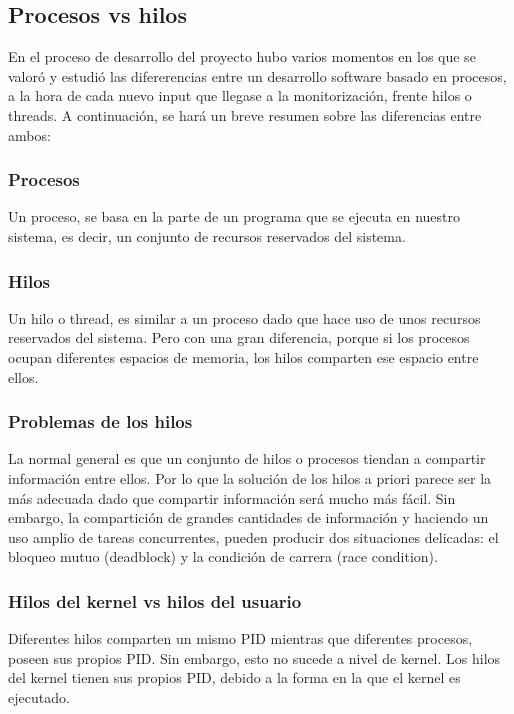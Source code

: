 \subsection{Procesos vs hilos}

En el proceso de desarrollo del proyecto hubo varios momentos en los que se valoró y estudió las difererencias entre un desarrollo software basado en procesos, a la hora de cada nuevo input que llegase a la monitorización, frente hilos o threads. A continuación, se hará un breve resumen sobre las diferencias entre ambos:

\subsubsection{Procesos}

Un proceso, se basa en la parte de un programa que se ejecuta en nuestro sistema, es decir, un conjunto de recursos reservados del sistema.

\subsubsection{Hilos}

Un hilo o thread, es similar a un proceso dado que hace uso de unos recursos reservados del sistema. Pero con una gran diferencia, porque si los procesos ocupan diferentes espacios de memoria, los hilos comparten ese espacio entre ellos.

\subsubsection{Problemas de los hilos}

La normal general es que un conjunto de hilos o procesos tiendan a compartir información entre ellos. Por lo que la solución de los hilos a priori parece ser la más adecuada dado que compartir información será mucho más fácil. Sin embargo, la compartición de grandes cantidades de información y haciendo un uso amplio de tareas concurrentes, pueden producir dos situaciones delicadas: el bloqueo mutuo (deadblock) y la condición de carrera (race condition).\\

\subsubsection{Hilos del kernel vs hilos del usuario}

Diferentes hilos comparten un mismo PID mientras que diferentes procesos, poseen sus propios PID. Sin embargo, esto no sucede a nivel de kernel. Los hilos del kernel tienen sus propios PID, debido a la forma en la que el kernel es ejecutado.\\

